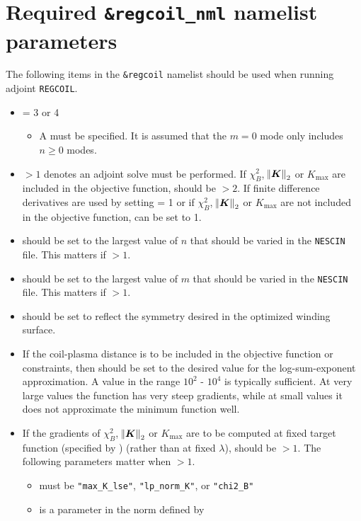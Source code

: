 \section{Required \texttt{\&regcoil\_nml} namelist parameters}
The following items in the \texttt{\&regcoil} namelist should be used when running adjoint \texttt{REGCOIL}. 
\begin{itemize}
\item {} = 3 or 4 
    \begin{itemize}
    \item A  must be specified. It is assumed that the $m=0$ mode only includes $n\geq0$ modes. 
    \end{itemize}
\item {} $>1$ denotes an adjoint solve must be performed. If $\chi^2_B$, $\norm{\bm{K}}_2$ or $K_{\text{max}}$ are included in the objective function,  should be $>2$. If finite difference derivatives are used by setting  = 1 or if $\chi^2_B$, $\norm{\bm{K}}_2$ or $K_{\text{max}}$ are not included in the objective function,  can be set to 1. 
\item {} should be set to the largest value of $n$ that should be varied in the \texttt{NESCIN} file. This matters if  $>1$.
\item {} should be set to the largest value of $m$ that should be varied in the \texttt{NESCIN} file. This matters if  $>1$.
\item {} should be set to reflect the symmetry desired in the optimized winding surface. 
\item If the coil-plasma distance is to be included in the objective function or constraints, then  should be set to the desired value for the log-sum-exponent approximation. A value in the range $10^{2}$ - $10^4$ is typically sufficient. At very large values the function has very steep gradients, while at small values it does not approximate the minimum function well. 
\item If the gradients of $\chi^2_B$, $\norm{\bm{K}}_2$ or $K_{\text{max}}$  are to be computed at fixed target function (specified by ) (rather than at fixed $\lambda$),  should be $>1$. The following parameters matter when  $>1$. 
	\begin{itemize}
	\item {} must be \texttt{"max\_K\_lse"}, \texttt{"lp\_norm\_K"}, or \texttt{"chi2\_B"}
	\item {} is a parameter in the norm defined by 
	\end{itemize}
\end{itemize}

